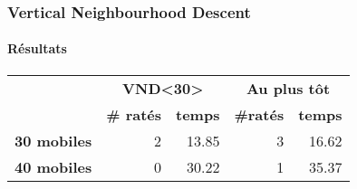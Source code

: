 \begin{frame}
	\frametitle{Vertical Neighbourhood Descent}
	\framesubtitle{Résultats}
	\centering
	\begin{tabular}{l|c|r|c|r|}
		\cline{2-5}
		\multirow{2}{*}{}                         & \multicolumn{2}{c|}{\textbf{VND\textless30\textgreater}}     & \multicolumn{2}{c|}{\textbf{Au plus tôt}}                    \\ \cline{2-5} 
		                                          & \textbf{\# ratés}      & \multicolumn{1}{c|}{\textbf{temps}} & \textbf{\#ratés}       & \multicolumn{1}{c|}{\textbf{temps}} \\ \hline
		\multicolumn{1}{|r|}{\textbf{30 mobiles}} & \multicolumn{1}{r|}{2} & 13.85                               & \multicolumn{1}{r|}{3} & 16.62                               \\ \hline
		\multicolumn{1}{|r|}{\textbf{40 mobiles}} & \multicolumn{1}{r|}{0} & 30.22                               & \multicolumn{1}{r|}{1} & 35.37                               \\ \hline
	\end{tabular}
\end{frame}
